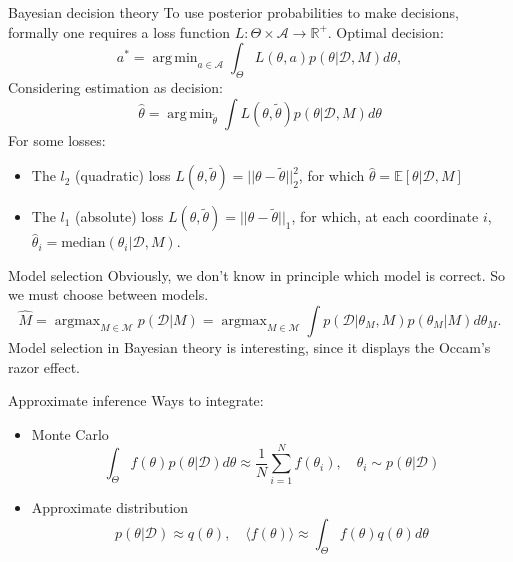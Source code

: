 \documentclass{beamer}
\DeclareMathOperator*{\argmin}{arg\,min}
\newcommand{\argmax}{\operatorname{argmax}}
\def \Ev {{\mathbb E}}
\begin{document}
\begin{frame}{}
\begin{block}{Bayesian decision theory}
To use posterior probabilities to make decisions, formally one requires a loss function $L : \Theta \times \mathcal{A} \to \mathbb{R}^+$. Optimal decision:
\begin{equation*}\label{generalloss}
a^* = \argmin_{a \in \mathcal{A}} \int_\Theta L(\theta,a) p(\theta|\mathcal{D},M) d \theta,
\end{equation*}
Considering estimation as decision:
\begin{equation*}
\hat{\theta} = \argmin_{\tilde{\theta}} \int L(\theta,\tilde{\theta}) p(\theta|\mathcal{D},M) d \theta
\end{equation*}
For some losses:
\begin{itemize}
	\item The $l_2$ (quadratic) loss $L(\theta,\tilde{\theta}) = ||\theta - \tilde{\theta}||_2^2$, for which $\hat{\theta} = \Ev[\theta|\mathcal{D},M]$
	\item The $l_1$ (absolute) loss $L(\theta,\tilde{\theta}) = ||\theta - \tilde{\theta}||_1$, for which, at each coordinate $i$, $\hat{\theta}_i = \text{median}(\theta_i|\mathcal{D},M)$.
\end{itemize}
\end{block}
\end{frame}
\begin{frame}{}
\begin{block}{Model selection}
Obviously, we don't know in principle which model is correct. So we must choose between models.
\begin{equation*}\label{modelselectionobjective}
\hat{M} = \argmax_{M \in \mathcal{M}} p(\mathcal{D} | M) = \argmax_{M \in \mathcal{M}} \int p(\mathcal{D} | \theta_M, M) p(\theta_M | M) d\theta_M.
\end{equation*}
Model selection in Bayesian theory is interesting, since it displays the Occam's razor effect.
\end{block}
\end{frame}

\begin{frame}{}
\begin{block}{Approximate inference}
Ways to integrate:
\begin{itemize}
\item Monte Carlo
\begin{equation*}
\int_\Theta f(\theta) p(\theta|\mathcal{D}) d\theta \approx \frac{1}{N} \sum_{i=1}^N f(\theta_i), \quad \theta_i \sim p(\theta|\mathcal{D})
\end{equation*}
\item Approximate distribution
\begin{equation*}
p(\theta|\mathcal{D}) \approx q(\theta), \quad \langle f(\theta) \rangle \approx \int_\Theta f(\theta) q(\theta) d\theta
\end{equation*}
\end{itemize}

\end{block}
\end{frame}
\end{document}
